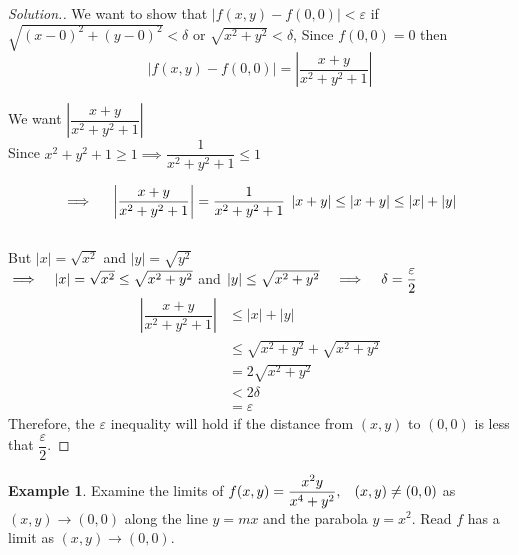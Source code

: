 \documentclass[11pt,a4paper]{article}
\theoremstyle{definition}
\newtheorem{exa}[thm]{Example}
\newenvironment{solution}
  {\renewcommand{\qedsymbol}{}\begin{proof}[\textit{Solution}.]}
  {\end{proof}}
\begin{document}
\begin{solution}


We want to show that $\left|f(x,y) - f(0,0)\right| < \varepsilon$ if $\sqrt{(x - 0)^2 + (y - 0)^2} <\delta$ or $\sqrt{x^2 + y^2}< \delta$,\hspace{0.2cm}
Since $f(0,0) = 0$ then $$\left|f(x,y) - f(0,0)\right| = \left|\dfrac{x + y}{x^2 + y^2 + 1}\right|$$

We want $\left|\dfrac{x + y}{x^2 + y^2 + 1}\right|$\\

Since $x^2 + y^2 + 1 \geq 1 \implies \dfrac{1}{x^2 + y^2 + 1}\leq 1$


$$\implies\hspace{0.4cm} \left|\dfrac{x + y}{x^2 + y^2 + 1}\right|  = \dfrac{1}{x^2 + y^2 + 1}\hspace{0.1cm}\left|x + y\right|\leq \left|x + y\right|\leq \left|x\right| + \left|y\right|$$\\

But $\left|x\right| = \sqrt{x^2}$ and $\left|y\right| = \sqrt{y^2}$\\

$\implies \hspace{0.3cm} \left|x\right| = \sqrt{x^2} \leq \sqrt{x^2 + y^2}$ and $\left|y\right|\leq \sqrt{x^2 + y^2} \hspace{0.3cm}\implies\hspace{0.3cm} \delta = \dfrac{\varepsilon}{2}$\\

\begin{align*}
\left|\dfrac{x + y}{x^2 + y^2 + 1}\right| & \leq \left|x\right| + \left|y\right|\\
& \leq \sqrt{x^2 + y^2} + \sqrt{x^2 + y^2}\\
& = 2\sqrt{x^2 + y^2}\\
& < 2\delta\\
& = \varepsilon
\end{align*}
Therefore, the $\varepsilon$ inequality will hold if the distance from $(x,y)$ to $(0,0)$ is less that $\dfrac{\varepsilon}{2}$.
\end{solution}


\begin{exa}


Examine the limits of $f(x,y) = \dfrac{x^2y}{x^4 + y^2},\hspace{0.3cm} (x,y) \neq (0,0)$ as $(x,y) \longrightarrow (0,0)$ along the line $y = mx$ and the parabola $y = x^2$. Read $f$ has a limit as $(x,y) \longrightarrow (0,0)$.
\end{exa}
\end{document}
